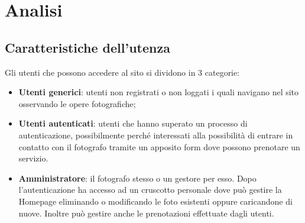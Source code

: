 \section{Analisi}

\subsection{Caratteristiche dell'utenza}
Gli utenti che possono accedere al sito si dividono in 3 categorie:
\begin{itemize}
    \item \textbf{Utenti generici}: utenti non registrati o non loggati i quali navigano nel sito osservando le opere fotografiche;
    \item \textbf{Utenti autenticati}: utenti che hanno superato un processo di autenticazione, possibilmente perch\'e interessati alla possibilit\`a di entrare in contatto con il fotografo tramite un apposito form dove possono prenotare un servizio.
    \item \textbf{Amministratore}: il fotografo stesso o un gestore per esso. Dopo l'autenticazione ha accesso ad un cruscotto personale dove pu\`o gestire la Homepage eliminando o modificando le foto esistenti oppure caricandone di nuove. Inoltre pu\`o gestire anche le prenotazioni effettuate dagli utenti.
\end{itemize}

